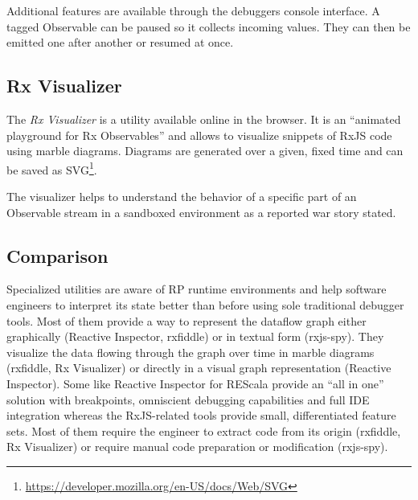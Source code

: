 \documentclass[12pt,a4paper]{article}
\begin{document}
Additional features are available through the debuggers console interface. A tagged Observable can be paused so it collects incoming values. They can then be emitted one after another or resumed at once.

\subsection{Rx Visualizer}

The \emph{Rx Visualizer}\cite{rxviz} is a utility available online in the browser. It is an ``animated playground for Rx Observables''\cite{rxviz} and allows to visualize snippets of RxJS code using marble diagrams. Diagrams are generated over a given, fixed time and can be saved as SVG\footnote{\url{https://developer.mozilla.org/en-US/docs/Web/SVG}}.

The visualizer helps to understand the behavior of a specific part of an Observable stream in a sandboxed environment as a reported war story stated.

\subsection{Comparison}

Specialized utilities are aware of RP runtime environments and help software engineers to interpret its state better than before using sole traditional debugger tools. Most of them provide a way to represent the dataflow graph either graphically (Reactive Inspector, rxfiddle) or in textual form (rxjs-spy). They visualize the data flowing through the graph over time in marble diagrams (rxfiddle, Rx Visualizer) or directly in a visual graph representation (Reactive Inspector). Some like Reactive Inspector for REScala provide an ``all in one'' solution with breakpoints, omniscient debugging capabilities and full IDE integration whereas the RxJS-related tools provide small, differentiated feature sets. Most of them require the engineer to extract code from its origin (rxfiddle, Rx Visualizer) or require manual code preparation or modification (rxjs-spy).
\end{document}
